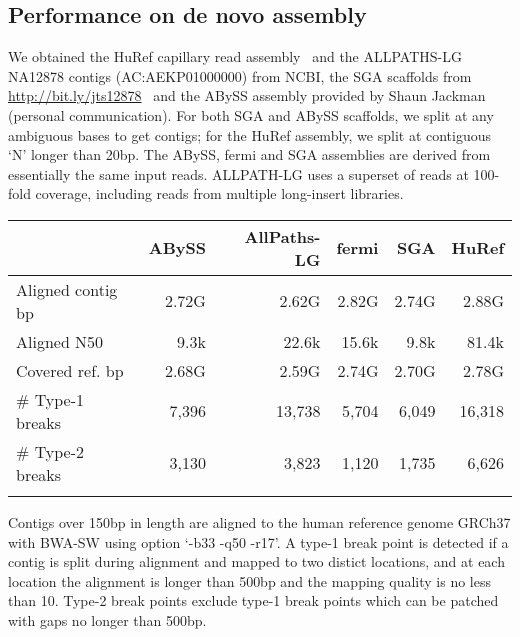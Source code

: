 \documentclass{bioinfo}
\begin{document}
\subsection{Performance on de novo assembly}
We obtained the HuRef capillary read assembly~\citep{Levy:2007uq} and the
ALLPATHS-LG NA12878 contigs (AC:AEKP01000000) from NCBI, the SGA scaffolds from
\mbox{\href{http://bit.ly/jts12878}{http://bit.ly/jts12878}}~\citep{Simpson:2011ly}
and the ABySS assembly provided by Shaun Jackman (personal communication).
For both SGA and ABySS scaffolds, we split at any ambiguous bases to get
contigs; for the HuRef assembly, we split at contiguous `N' longer than 20bp.
The ABySS, fermi and SGA assemblies are derived from essentially the same input
reads. ALLPATH-LG uses a superset of reads at 100-fold coverage, including
reads from multiple long-insert libraries.

\begin{table}[bt]
{\begin{tabular}{lrrrrr}
\toprule

                     & ABySS & AllPaths-LG & fermi & SGA & HuRef \\
\midrule
Aligned contig bp    & 2.72G & 2.62G & 2.82G & 2.74G & 2.88G \\
Aligned N50          & 9.3k  & 22.6k & 15.6k & 9.8k  & 81.4k \\
Covered ref. bp      & 2.68G & 2.59G & 2.74G & 2.70G & 2.78G \\
\# Type-1 breaks     & 7,396 &13,738 & 5,704 & 6,049 & 16,318 \\
\# Type-2 breaks     & 3,130 & 3,823 & 1,120 & 1,735 & 6,626 \\
\botrule
\end{tabular}}{Contigs over 150bp in length are aligned to the human reference
genome GRCh37 with BWA-SW using option `-b33 -q50 -r17'. A type-1 break point
is detected if a contig is split during alignment and mapped to two distict
locations, and at each location the alignment is longer than 500bp and the
mapping quality is no less than 10. Type-2 break points exclude type-1 break
points which can be patched with gaps no longer than 500bp.} \end{table}
\end{document}
